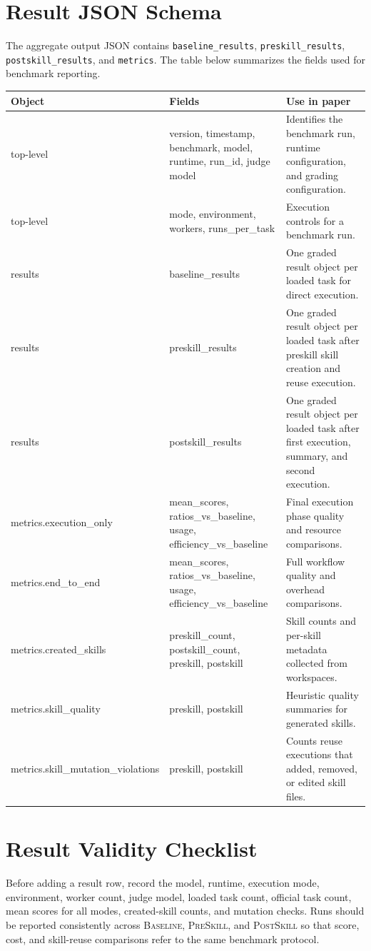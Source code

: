 \documentclass[11pt]{article}
\newcommand{\baseline}{\textsc{Baseline}}
\newcommand{\preskill}{\textsc{PreSkill}}
\newcommand{\postskill}{\textsc{PostSkill}}
\begin{document}
\section{Result JSON Schema}
\label{app:json}
The aggregate output JSON contains \texttt{baseline\_results}, \texttt{preskill\_results}, \texttt{postskill\_results}, and \texttt{metrics}. The table below summarizes the fields used for benchmark reporting.
\begin{center}
\footnotesize
{}
\label{tab:result-json-fields}
\begin{tabular}{L{0.30\textwidth}L{0.25\textwidth}L{0.35\textwidth}}
\toprule
\textbf{Object} & \textbf{Fields} & \textbf{Use in paper} \\
\midrule
top-level & version, timestamp, benchmark, model, runtime, run\_id, judge model & Identifies the benchmark run, runtime configuration, and grading configuration. \\
top-level & mode, environment, workers, runs\_per\_task & Execution controls for a benchmark run. \\
results & baseline\_results & One graded result object per loaded task for direct execution. \\
results & preskill\_results & One graded result object per loaded task after preskill skill creation and reuse execution. \\
results & postskill\_results & One graded result object per loaded task after first execution, summary, and second execution. \\
metrics.execution\_only & mean\_scores, ratios\_vs\_baseline, usage, efficiency\_vs\_baseline & Final execution phase quality and resource comparisons. \\
metrics.end\_to\_end & mean\_scores, ratios\_vs\_baseline, usage, efficiency\_vs\_baseline & Full workflow quality and overhead comparisons. \\
metrics.created\_skills & preskill\_count, postskill\_count, preskill, postskill & Skill counts and per-skill metadata collected from workspaces. \\
metrics.skill\_quality & preskill, postskill & Heuristic quality summaries for generated skills. \\
metrics.skill\_mutation\_violations & preskill, postskill & Counts reuse executions that added, removed, or edited skill files. \\
\bottomrule
\end{tabular}
\end{center}

\section{Result Validity Checklist}
\label{app:checklist}
Before adding a result row, record the model, runtime, execution mode, environment, worker count, judge model, loaded task count, official task count, mean scores for all modes, created-skill counts, and mutation checks.
Runs should be reported consistently across \baseline{}, \preskill{}, and \postskill{} so that score, cost, and skill-reuse comparisons refer to the same benchmark protocol.
\end{document}
